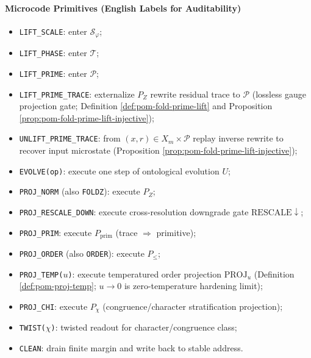 \paragraph{Microcode Primitives (English Labels for Auditability)}
\begin{itemize}
  \item \texttt{LIFT\_SCALE}: enter $\mathcal{S}_\varphi$;
  \item \texttt{LIFT\_PHASE}: enter $\mathcal{T}$;
  \item \texttt{LIFT\_PRIME}: enter $\mathcal{P}$;
  \item \texttt{LIFT\_PRIME\_TRACE}: externalize $P_Z$ rewrite residual trace to $\mathcal{P}$ (lossless gauge projection gate; Definition \ref{def:pom-fold-prime-lift} and Proposition \ref{prop:pom-fold-prime-lift-injective});
  \item \texttt{UNLIFT\_PRIME\_TRACE}: from $(x,r)\in X_m\times\mathcal{P}$ replay inverse rewrite to recover input microstate (Proposition \ref{prop:pom-fold-prime-lift-injective});
  \item \texttt{EVOLVE(op)}: execute one step of ontological evolution $U$;
  \item \texttt{PROJ\_NORM} (also \texttt{FOLDZ}): execute $P_Z$;
  \item \texttt{PROJ\_RESCALE\_DOWN}: execute cross-resolution downgrade gate $\mathrm{RESCALE}\downarrow$;
  \item \texttt{PROJ\_PRIM}: execute $P_{\mathrm{prim}}$ (trace $\Rightarrow$ primitive);
  \item \texttt{PROJ\_ORDER} (also \texttt{ORDER}): execute $P_{\le}$;
  \item \texttt{PROJ\_TEMP($u$)}: execute temperatured order projection $\mathrm{PROJ}_u$ (Definition \ref{def:pom-proj-temp}; $u\to 0$ is zero-temperature hardening limit);
  \item \texttt{PROJ\_CHI}: execute $P_\chi$ (congruence/character stratification projection);
  \item \texttt{TWIST($\chi$)}: twisted readout for character/congruence class;
  \item \texttt{CLEAN}: drain finite margin and write back to stable address.
\end{itemize}

